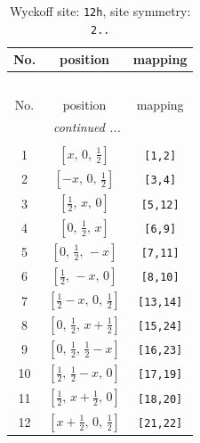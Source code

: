 \documentclass[fleqn,8pt]{jsarticle}
\begin{document}
\begin{longtable}{ccc}
\caption{Wyckoff site: {\tt 12h}, site symmetry: {\tt 2..}}
 \\
 \hline \hline
No. & position & mapping \\ \hline \endfirsthead

\multicolumn{2}{l}{\tablename\ \thetable{}} \\
 \hline \hline
No. & position & mapping \\ \hline \endhead

 \hline \hline
\multicolumn{2}{r}{\footnotesize\it continued ...} \\ \endfoot

 \hline \hline
\multicolumn{2}{r}{} \\ \endlastfoot

1 & $\left[ x,\, 0,\, \frac{1}{2} \right]$ & {\tt [1,2]} \\ \hline
2 & $\left[ - x,\, 0,\, \frac{1}{2} \right]$ & {\tt [3,4]} \\ \hline
3 & $\left[ \frac{1}{2},\, x,\, 0 \right]$ & {\tt [5,12]} \\ \hline
4 & $\left[ 0,\, \frac{1}{2},\, x \right]$ & {\tt [6,9]} \\ \hline
5 & $\left[ 0,\, \frac{1}{2},\, - x \right]$ & {\tt [7,11]} \\ \hline
6 & $\left[ \frac{1}{2},\, - x,\, 0 \right]$ & {\tt [8,10]} \\ \hline
7 & $\left[ \frac{1}{2} - x,\, 0,\, \frac{1}{2} \right]$ & {\tt [13,14]} \\ \hline
8 & $\left[ 0,\, \frac{1}{2},\, x + \frac{1}{2} \right]$ & {\tt [15,24]} \\ \hline
9 & $\left[ 0,\, \frac{1}{2},\, \frac{1}{2} - x \right]$ & {\tt [16,23]} \\ \hline
10 & $\left[ \frac{1}{2},\, \frac{1}{2} - x,\, 0 \right]$ & {\tt [17,19]} \\ \hline
11 & $\left[ \frac{1}{2},\, x + \frac{1}{2},\, 0 \right]$ & {\tt [18,20]} \\ \hline
12 & $\left[ x + \frac{1}{2},\, 0,\, \frac{1}{2} \right]$ & {\tt [21,22]} \\
\end{longtable}
\renewcommand{\arraystretch}{1.2}
\end{document}
